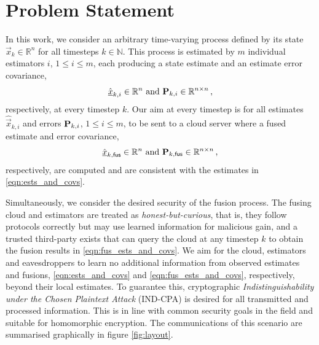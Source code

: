 \documentclass[letterpaper, 10 pt, conference]{ieeeconf}
\begin{document}
% 
%                                              
%                                              
%                                              
% 
\section{Problem Statement}\label{sec:problem}
In this work, we consider an arbitrary time-varying process defined by its state $\vec{x}_k \in \mathbb{R}^n$ for all timesteps $k \in \mathbb{N}$. This process is estimated by $m$ individual estimators $i$, $1\leq i\leq m$, each producing a state estimate and an estimate error covariance,
\begin{equation}\label{eqn:ests_and_covs}
    \hat{{\underline{x}}}_{k,i} \in \mathbb{R}^n \text{ and } {\ensuremath{{\mathbf{P}}}}_{k,i} \in \mathbb{R}^{n\times n}\,,
\end{equation}
respectively, at every timestep $k$. Our aim at every timestep is for all estimates $\hat{\vec{x}}_{k,i}$ and errors ${{\mathbf{P}}}_{k,i}$, $1\leq i\leq m$, to be sent to a cloud server where a fused estimate and error covariance,
\begin{equation}\label{eqn:fus_ests_and_covs}
    \hat{{\underline{x}}}_{k,\mathsf{fus}} \in \mathbb{R}^n \text{ and } {\ensuremath{{\mathbf{P}}}}_{k,\mathsf{fus}} \in \mathbb{R}^{n\times n}\,,
\end{equation}
respectively, are computed and are consistent with the estimates in \eqref{eqn:ests_and_covs}.

Simultaneously, we consider the desired security of the fusion process. The fusing cloud and estimators are treated as \textit{honest-but-curious}, that is, they follow protocols correctly but may use learned information for malicious gain, and a trusted third-party exists that can query the cloud at any timestep $k$ to obtain the fusion results in \eqref{eqn:fus_ests_and_covs}. We aim for the cloud, estimators and eavesdroppers to learn no additional information from observed estimates and fusions, \eqref{eqn:ests_and_covs} and \eqref{eqn:fus_ests_and_covs}, respectively, beyond their local estimates. To guarantee this, cryptographic \textit{Indistinguishability under the Chosen Plaintext Attack} (IND-CPA) \cite{katzIntroductionModernCryptography2008} is desired for all transmitted and processed information. This is in line with common security goals in the field and suitable for homomorphic encryption. The communications of this scenario are summarised graphically in figure \ref{fig:layout}.
\end{document}
